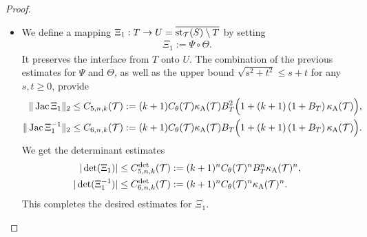 \documentclass[10pt,letterpaper]{article}
\begin{document}
\begin{proof}
\begin{itemize}
        
        
        
        \item 
        We define a mapping $ \Xi_{1} : T \rightarrow U = \overline{\operatorname{st}_{{\mathcal T}}(S) \setminus T}$ by setting 
        \begin{align*}
            \Xi_{1} := \Psi \circ \Theta.
        \end{align*}
        It preserves the interface from $T$ onto $U$. 
        The combination of the previous estimates for $\Psi$ and $\Theta$,
        as well as the upper bound $\sqrt{s^2+t^2} \leq s + t$ for any $s,t \geq 0$,
        provide 
        \begin{align*}
            \|  \operatorname{{\rm Jac}} \Xi_{1}  \|_{2}
            &\leq 
            C_{5,n,k}({\mathcal T})
            :=
            (k+1) 
            C_\theta({\mathcal T})
            \kappa_{\rm A}({\mathcal T})
            B_{T}^{2}
            \Big( 
                1 
                + 
                (k+1) 
                \left( 1 + B_{T} \right)
                \kappa_{\rm A}({\mathcal T})
            \Big)            
            ,
            \\
            \|  \operatorname{{\rm Jac}} \Xi_{1}^{-1}  \|_{2}
            &\leq  
            C_{6,n,k}({\mathcal T})
            :=
            (k+1) 
            C_\theta({\mathcal T})
            \kappa_{\rm A}({\mathcal T})
            B_{T}
            \Big( 
                1 
                + 
                (k+1) 
                \left( 1 + B_{T} \right)
                \kappa_{\rm A}({\mathcal T})
            \Big)            
            .
        \end{align*}
        We get the determinant estimates
        \begin{align*}
            |\det(\Xi_{1})|
            &\leq 
            C^{\det}_{5,n,k}({\mathcal T})
            :=
            (k+1)^{n}
            C_\theta({\mathcal T})^{n}
            B_{T}^{n}
            \kappa_{\rm A}({\mathcal T})^{n}
            ,
            \\
            |\det(\Xi_{1}^{-1})|
            &\leq 
            C^{\det}_{6,n,k}({\mathcal T})
            :=
            (k+1)^{n}
            C_\theta({\mathcal T})^{n}
            \kappa_{\rm A}({\mathcal T})^{n}
            .
        \end{align*}
        This completes the desired estimates for $\Xi_{1}$. 
        

\end{itemize}
\end{proof}
\end{document}
